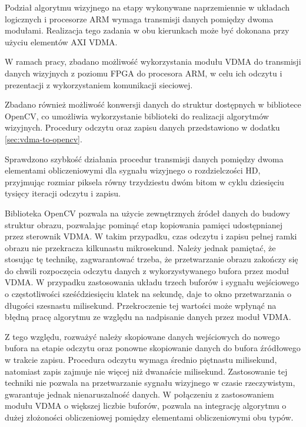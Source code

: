 Podział algorytmu wizyjnego na etapy wykonywane naprzemiennie w układach logicznych i procesorze ARM wymaga transmisji danych pomiędzy dwoma modułami. %
Realizacja tego zadania w obu kierunkach może być dokonana przy użyciu elementów AXI VDMA.

W ramach pracy, zbadano możliwość wykorzystania modułu VDMA do transmisji danych wizyjnych z poziomu FPGA do procesora ARM, w celu ich odczytu i prezentacji z wykorzystaniem komunikacji sieciowej.

Zbadano również możliwość konwersji danych do struktur dostępnych w bibliotece OpenCV, co umożliwia wykorzystanie biblioteki do realizacji algorytmów wizyjnych. 
Procedury odczytu oraz zapisu danych przedstawiono w dodatku \ref{sec:vdma-to-opencv}.

Sprawdzono szybkość działania procedur transmisji danych pomiędzy dwoma elementami obliczeniowymi dla sygnału wizyjnego o rozdzielczości HD, przyjmując rozmiar piksela równy trzydziestu dwóm bitom w cyklu dziesięciu tysięcy iteracji odczytu i zapisu.

Biblioteka OpenCV pozwala na użycie zewnętrznych źródeł danych do budowy struktur obrazu, pozwalając pominąć etap kopiowania pamięci udostępnianej przez sterownik VDMA. %
W takim przypadku, czas odczytu i zapisu pełnej ramki obrazu nie przekracza kilkunastu mikrosekund. 
Należy jednak pamiętać, że stosując tę technikę, zagwarantować trzeba, że przetwarzanie obrazu zakończy się do chwili rozpoczęcia odczytu danych z wykorzystywanego bufora przez moduł VDMA. 
W przypadku zastosowania układu trzech buforów i sygnału wejściowego o częstotliwości sześćdziesięciu klatek na sekundę, daje to okno przetwarzania o długości szesnastu milisekund. 
Przekroczenie tej wartości może wpłynąć na błędną pracę algorytmu ze względu na nadpisanie danych przez moduł VDMA.

Z tego względu, rozważyć należy skopiowane danych wejściowych do nowego bufora na etapie odczytu oraz ponowne skopiowanie danych do bufora źródłowego w trakcie zapisu. 
Procedura odczytu wymaga średnio piętnastu milisekund, natomiast zapis zajmuje nie więcej niż dwanaście milisekund. %
Zastosowanie tej techniki nie pozwala na przetwarzanie sygnału wizyjnego w czasie rzeczywistym, gwarantuje jednak nienaruszalność danych. 
W połączeniu z zastosowaniem modułu VDMA o większej liczbie buforów, pozwala na integrację algorytmu o dużej złożoności obliczeniowej pomiędzy elementami obliczeniowymi obu typów. %

